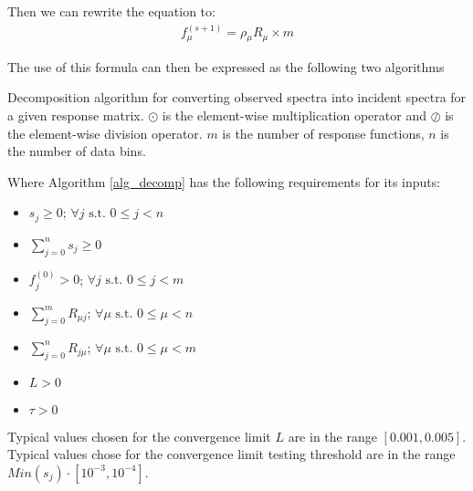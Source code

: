 \documentclass{article}
\makeatletter
\def\BState{\State\hskip-\ALG@thistlm}
\makeatother
\begin{document}
Then we can rewrite the equation to:
\begin{align}
f_{\mu}^{(s+1)} = \rho{}_{\mu} R_{\mu}\times{}m
\end{align}

The use of this formula can then be expressed as the following two algorithms

\begin{algorithm}[H]
\caption{Decomposition algorithm for converting observed spectra into incident spectra for a given response matrix. $\odot$ is the element-wise multiplication operator and $\oslash$ is the element-wise division operator. $m$ is the number of response functions, $n$ is the number of data bins.}\label{alg_decomp}
\end{algorithm}

Where Algorithm \ref{alg_decomp} has the following requirements for its inputs:
\begin{itemize}
\item $s_j \geq 0$; $\forall{}j \text{ s.t. } 0\leq{}j<n$
\item $\sum\limits_{j=0}^{n}s_j \geq 0$
\item $f^{(0)}_j > 0$; $\forall{}j \text{ s.t. } 0\leq{}j<m$
\item $\sum\limits_{j=0}^{m}R_{\mu{}j}$; $\forall{}\mu \text{ s.t. } 0\leq{}\mu<n$
\item $\sum\limits_{j=0}^{n}R_{j\mu{}}$; $\forall{}\mu \text{ s.t. } 0\leq{}\mu<m$
\item $L > 0$
\item $\tau > 0$
\end{itemize}

Typical values chosen for the convergence limit $L$ are in the range $[0.001, 0.005]$. Typical values chose for the convergence limit testing threshold are in the range $Min(s_j) \cdot{} [10^{-3}, 10^{-4}]$.
\end{document}
